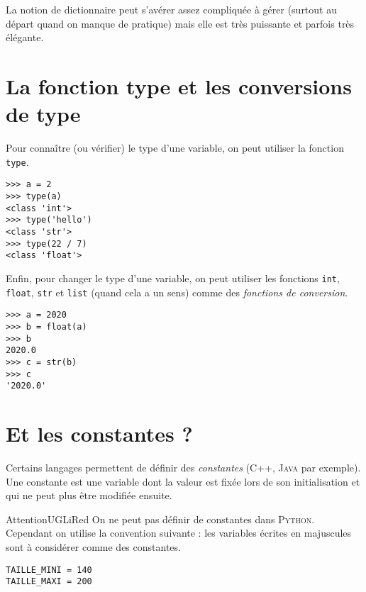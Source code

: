 La notion de dictionnaire peut s'avérer assez compliquée à gérer (surtout au départ quand on manque de pratique) mais elle est très puissante et parfois très élégante.\\

\section{La fonction type et les conversions de type}

Pour connaître (ou vérifier) le type d'une variable, on peut utiliser la fonction \texttt{type}.

\begin{pyc}\begin{verbatim}
>>> a = 2
>>> type(a)
<class 'int'>
>>> type('hello')
<class 'str'>
>>> type(22 / 7)
<class 'float'>
\end{verbatim}
\end{pyc}


Enfin, pour changer le type d'une variable, on peut utiliser les fonctions \texttt{int}, \texttt{float}, \texttt{str} et \texttt{list} (quand cela a un sens) comme des \textit{fonctions de conversion}.

\begin{pyc}\begin{verbatim}
>>> a = 2020
>>> b = float(a)
>>>	b
2020.0
>>> c = str(b)
>>> c
'2020.0'
\end{verbatim}
\end{pyc}

\section{Et les constantes ?}


Certains langages permettent de définir des \textit{constantes} (\textsc{C++}, \textsc{Java} par exemple). Une constante est une variable dont la valeur est fixée lors de son initialisation et qui ne peut plus être modifiée ensuite.

\begin{encadrecolore}{Attention}{UGLiRed}
    On ne peut pas définir de constantes dans \textsc{Python}.\\
    Cependant on utilise la convention suivante : les variables écrites en majuscules sont à considérer comme des constantes.
\end{encadrecolore}

\begin{pyc}\begin{verbatim}
TAILLE_MINI = 140
TAILLE_MAXI = 200
\end{verbatim}
\end{pyc}


